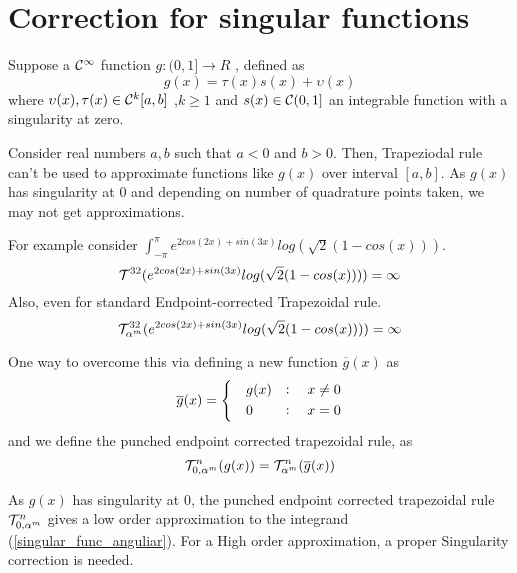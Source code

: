 \documentclass[../document.tex]{subfiles}
\begin{document}
	\section{Correction for singular functions}
	
	Suppose a $\mathcal{C}^{\infty}$ function $g:(0,1]\rightarrow R$ , defined as
	\begin{equation} \label{singular_func_anguliar}
		g(x) = 	\tau(x)s(x) + \upsilon(x)
	\end{equation}
	where $\upsilon(x) , \tau(x) \in \mathcal{C}^k[a,b]$ ,$k \geq 1$ and 
	$s(x) \in \mathcal{C}(0, 1]$ an integrable function with a singularity at zero.
	
	
	Consider real numbers $a,b$ such that $a<0$ and $b>0$. Then, Trapeziodal rule can't be used to approximate functions like $g(x)$ over interval $[a,b]$. As $g(x)$ has singularity at $0$ and depending on number of quadrature points taken, we may not get approximations.
	\vspace{3mm}
	
	For example consider $ \int_{-\pi}^{\pi} e^{2cos(2x)+sin(3x)}  
	log(\sqrt{2}( 1 - cos(x) ))$. 
	$$
	\mathcal{T}^{32} (e^{2cos(2x)+sin(3x)}  
	log(\sqrt{2}( 1 - cos(x) )))   = \infty
	$$
	Also, even for standard Endpoint-corrected Trapezoidal rule. 
	$$
	\mathcal{T}_{\alpha^m}^{32} (e^{2cos(2x)+sin(3x)}  
	log(\sqrt{2}( 1 - cos(x) )))   = \infty
	$$
	
	One way to overcome this via defining a new function $\overline{g}(x)$ as
	$$
	\overline{g}(x) =
	\begin{dcases}
		\quad g(x) &: \quad x \neq 0 \\
		\quad 0    &: \quad x = 0\\
	\end{dcases}
	$$
	and we define the punched endpoint corrected trapezoidal rule,  as
	\begin{equation}
		\mathcal{T}_{0,\alpha^m}^{n} (g(x))   =
		\mathcal{T}_{\alpha^m}^{n}(\overline{g}(x))
	\end{equation}
	
	
	As $g(x)$ has singularity at $0$, the punched endpoint corrected trapezoidal rule $\mathcal{T}_{0,\alpha^m}^{n}$ gives a low order approximation to the integrand (\ref{singular_func_anguliar}). For a High order approximation, a proper Singularity correction is needed.
	
	
\end{document}
